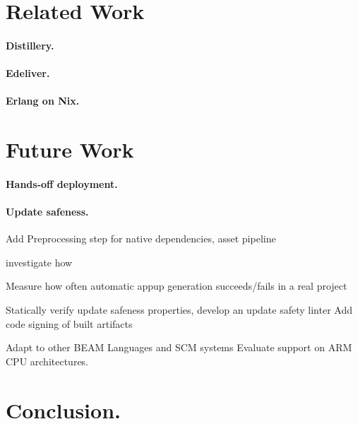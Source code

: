\cleardoublepage
\section{Related Work}
\label{sec:related_work}

\paragraph{Distillery.}
\paragraph{Edeliver.}
\paragraph{Erlang on Nix.}

\cleardoublepage
\section{Future Work}

\paragraph{Hands-off deployment.}


\paragraph{Update safeness.}

Add Preprocessing step for native dependencies, asset pipeline

investigate how


Measure how often automatic appup generation succeeds/fails in a real project

Statically verify update safeness properties, develop an update safety linter
Add code signing of built artifacts

Adapt to other BEAM Languages and SCM systems
Evaluate support on ARM CPU architectures.

\cleardoublepage
\section{Conclusion.}
